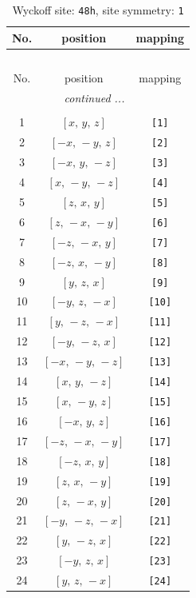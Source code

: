\documentclass[fleqn,8pt]{jsarticle}
\begin{document}
\begin{longtable}{ccc}
\caption{Wyckoff site: {\tt 48h}, site symmetry: {\tt 1}}
 \\
 \hline \hline
No. & position & mapping \\ \hline \endfirsthead

\multicolumn{2}{l}{\tablename\ \thetable{}} \\
 \hline \hline
No. & position & mapping \\ \hline \endhead

 \hline \hline
\multicolumn{2}{r}{\footnotesize\it continued ...} \\ \endfoot

 \hline \hline
\multicolumn{2}{r}{} \\ \endlastfoot

1 & $\left[ x,\, y,\, z \right]$ & {\tt [1]} \\ \hline
2 & $\left[ - x,\, - y,\, z \right]$ & {\tt [2]} \\ \hline
3 & $\left[ - x,\, y,\, - z \right]$ & {\tt [3]} \\ \hline
4 & $\left[ x,\, - y,\, - z \right]$ & {\tt [4]} \\ \hline
5 & $\left[ z,\, x,\, y \right]$ & {\tt [5]} \\ \hline
6 & $\left[ z,\, - x,\, - y \right]$ & {\tt [6]} \\ \hline
7 & $\left[ - z,\, - x,\, y \right]$ & {\tt [7]} \\ \hline
8 & $\left[ - z,\, x,\, - y \right]$ & {\tt [8]} \\ \hline
9 & $\left[ y,\, z,\, x \right]$ & {\tt [9]} \\ \hline
10 & $\left[ - y,\, z,\, - x \right]$ & {\tt [10]} \\ \hline
11 & $\left[ y,\, - z,\, - x \right]$ & {\tt [11]} \\ \hline
12 & $\left[ - y,\, - z,\, x \right]$ & {\tt [12]} \\ \hline
13 & $\left[ - x,\, - y,\, - z \right]$ & {\tt [13]} \\ \hline
14 & $\left[ x,\, y,\, - z \right]$ & {\tt [14]} \\ \hline
15 & $\left[ x,\, - y,\, z \right]$ & {\tt [15]} \\ \hline
16 & $\left[ - x,\, y,\, z \right]$ & {\tt [16]} \\ \hline
17 & $\left[ - z,\, - x,\, - y \right]$ & {\tt [17]} \\ \hline
18 & $\left[ - z,\, x,\, y \right]$ & {\tt [18]} \\ \hline
19 & $\left[ z,\, x,\, - y \right]$ & {\tt [19]} \\ \hline
20 & $\left[ z,\, - x,\, y \right]$ & {\tt [20]} \\ \hline
21 & $\left[ - y,\, - z,\, - x \right]$ & {\tt [21]} \\ \hline
22 & $\left[ y,\, - z,\, x \right]$ & {\tt [22]} \\ \hline
23 & $\left[ - y,\, z,\, x \right]$ & {\tt [23]} \\ \hline
24 & $\left[ y,\, z,\, - x \right]$ & {\tt [24]} \\
\end{longtable}
\end{document}
